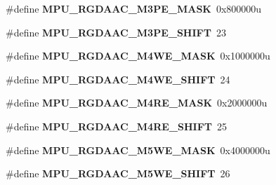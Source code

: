\begin{DoxyCompactItemize}
\item 
\#define {\bfseries M\+P\+U\+\_\+\+R\+G\+D\+A\+A\+C\+\_\+\+M3\+P\+E\+\_\+\+M\+A\+SK}~0x800000u\hypertarget{group__MPU__Register__Masks_gaf361bfcfc19483a42793f5e71e671d24}{}\label{group__MPU__Register__Masks_gaf361bfcfc19483a42793f5e71e671d24}

\item 
\#define {\bfseries M\+P\+U\+\_\+\+R\+G\+D\+A\+A\+C\+\_\+\+M3\+P\+E\+\_\+\+S\+H\+I\+FT}~23\hypertarget{group__MPU__Register__Masks_ga8a60d03cdf81d71a14695b19a9dcddbc}{}\label{group__MPU__Register__Masks_ga8a60d03cdf81d71a14695b19a9dcddbc}

\item 
\#define {\bfseries M\+P\+U\+\_\+\+R\+G\+D\+A\+A\+C\+\_\+\+M4\+W\+E\+\_\+\+M\+A\+SK}~0x1000000u\hypertarget{group__MPU__Register__Masks_ga83e0fd88964bf881fff84ec5148be122}{}\label{group__MPU__Register__Masks_ga83e0fd88964bf881fff84ec5148be122}

\item 
\#define {\bfseries M\+P\+U\+\_\+\+R\+G\+D\+A\+A\+C\+\_\+\+M4\+W\+E\+\_\+\+S\+H\+I\+FT}~24\hypertarget{group__MPU__Register__Masks_gab956bade9f6a200c49007ae0385b5838}{}\label{group__MPU__Register__Masks_gab956bade9f6a200c49007ae0385b5838}

\item 
\#define {\bfseries M\+P\+U\+\_\+\+R\+G\+D\+A\+A\+C\+\_\+\+M4\+R\+E\+\_\+\+M\+A\+SK}~0x2000000u\hypertarget{group__MPU__Register__Masks_ga19bff0a0a5537826851816728dbe1845}{}\label{group__MPU__Register__Masks_ga19bff0a0a5537826851816728dbe1845}

\item 
\#define {\bfseries M\+P\+U\+\_\+\+R\+G\+D\+A\+A\+C\+\_\+\+M4\+R\+E\+\_\+\+S\+H\+I\+FT}~25\hypertarget{group__MPU__Register__Masks_ga2396d0d3aa02d1ce7d63b375306171db}{}\label{group__MPU__Register__Masks_ga2396d0d3aa02d1ce7d63b375306171db}

\item 
\#define {\bfseries M\+P\+U\+\_\+\+R\+G\+D\+A\+A\+C\+\_\+\+M5\+W\+E\+\_\+\+M\+A\+SK}~0x4000000u\hypertarget{group__MPU__Register__Masks_ga9a15b77ff19841d163202e5f08e59941}{}\label{group__MPU__Register__Masks_ga9a15b77ff19841d163202e5f08e59941}

\item 
\#define {\bfseries M\+P\+U\+\_\+\+R\+G\+D\+A\+A\+C\+\_\+\+M5\+W\+E\+\_\+\+S\+H\+I\+FT}~26\hypertarget{group__MPU__Register__Masks_ga32b48238ec363343bb84eb701503ac64}{}\label{group__MPU__Register__Masks_ga32b48238ec363343bb84eb701503ac64}


\end{DoxyCompactItemize}
